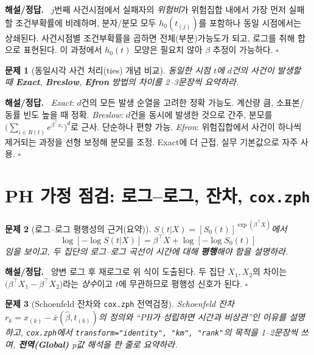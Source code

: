 \documentclass[12pt]{article}
\theoremstyle{myplain}
\newtheorem{problem}{문제}
\newenvironment{solution}{%
  \par\noindent\textbf{해설/정답.}\ }{\hfill$\square$\par}
\begin{document}
\begin{solution}
$j$번째 사건시점에서 실패자의 \emph{위험비}가 위험집합 내에서 가장 먼저 실패할 조건부확률에 비례하며,
분자/분모 모두 $h_0(t_{(j)})$를 포함하나 동일 시점에서는 상쇄된다.
사건시점별 조건부확률을 곱하면 전체(부분)가능도가 되고, 로그를 취해 합으로 표현된다.
이 과정에서 $h_0(t)$ 모양은 필요치 않아 $\beta$ 추정이 가능하다.
\end{solution}

\begin{problem}[동일시각 사건 처리(ties) 개념 비교]
동일한 시점 $t$에 $d$건의 사건이 발생할 때 \textbf{Exact}, \textbf{Breslow}, \textbf{Efron} 방법의 차이를 2--3문장씩 요약하라.
\end{problem}

\begin{solution}
\emph{Exact}: $d$건의 모든 발생 순열을 고려한 정확 가능도. 계산량 큼, 소표본/동률 빈도 높을 때 정확.
\emph{Breslow}: $d$건을 동시에 발생한 것으로 간주, 분모를 $\big(\sum_{i\in R(t)} e^{\beta^\top x_i}\big)^d$로 근사. 단순하나 편향 가능.
\emph{Efron}: 위험집합에서 사건이 하나씩 제거되는 과정을 선형 보정해 분모를 조정. Exact에 더 근접, 실무 기본값으로 자주 사용.
\end{solution}

\section{PH 가정 점검: 로그--로그, 잔차, \texttt{cox.zph}}

\begin{problem}[로그--로그 평행성의 근거(요약)]
$S(t|X)=[S_0(t)]^{\exp(\beta^\top X)}$에서
\[
\log[-\log S(t|X)]=\beta^\top X + \log[-\log S_0(t)]
\]
임을 보이고, \emph{두 집단}의 로그--로그 곡선이 시간에 대해 \textbf{평행}해야 함을 설명하라.
\end{problem}

\begin{solution}
양변 로그 후 재로그로 위 식이 도출된다. 두 집단 $X_1,X_2$의 차이는
$\big(\beta^\top X_1-\beta^\top X_2\big)$라는 \emph{상수}이고 $t$에 무관하므로 평행성 신호가 된다.
\end{solution}

\begin{problem}[Schoenfeld 잔차와 \texttt{cox.zph} 전역검정]
Schoenfeld 잔차 $r_k=x_{(k)}-\bar x(\hat\beta,t_{(k)})$의 정의와 ``PH가 성립하면 시간과 비상관''인 이유를 설명하고,
\texttt{cox.zph}에서 \texttt{transform="identity", "km", "rank"}의 목적을 1--2문장씩 쓰며, \textbf{전역(Global)} p값 해석을 한 줄로 요약하라.
\end{problem}
\end{document}
